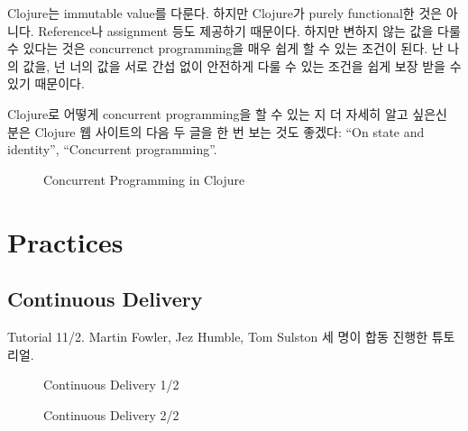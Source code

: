 \documentclass[11pt]{article}
\begin{document}
Clojure는 immutable value를 다룬다. 하지만  Clojure가 purely functional한 
것은 아니다. Reference나 assignment 등도 제공하기 때문이다. 
하지만 변하지 않는 값을 다룰 수 있다는 것은 concurrenct programming을 매우 
쉽게 할 수 있는 조건이 된다. 난 나의 값을, 넌 너의 값을 서로 간섭 없이 
안전하게 다룰 수 있는 조건을 쉽게 보장 받을 수 있기 때문이다.

Clojure로 어떻게 concurrent programming을 할 수 있는 지 더 자세히 알고 싶은신
분은 Clojure 웹 사이트의 다음 두 글을 한 번 보는 것도 좋겠다:  ``On state and
identity'', ``Concurrent programming''.
 
\begin{figure}[t]
    \begin{Frame}
        \begin{center}
        \end{center}
    \end{Frame}
    \caption{Concurrent Programming in Clojure}
    \label{clojure concurrent}
\end{figure}

\section{Practices}

\subsection{Continuous Delivery}
\label{sec:continuous delivery}

Tutorial 11/2.
Martin Fowler, Jez Humble, Tom Sulston 세 명이 합동 진행한 튜토리얼.

\begin{figure}[t]
    \begin{Frame}
        \begin{center}
        \end{center}
    \end{Frame}
    \caption{Continuous Delivery 1/2}
    \label{Continuous Delivery 1}
\end{figure}

\begin{figure}[t]
    \begin{Frame}
        \begin{center}
        \end{center}
    \end{Frame}
    \caption{Continuous Delivery 2/2}
    \label{Continuous Delivery 2}
\end{figure}
\end{document}
